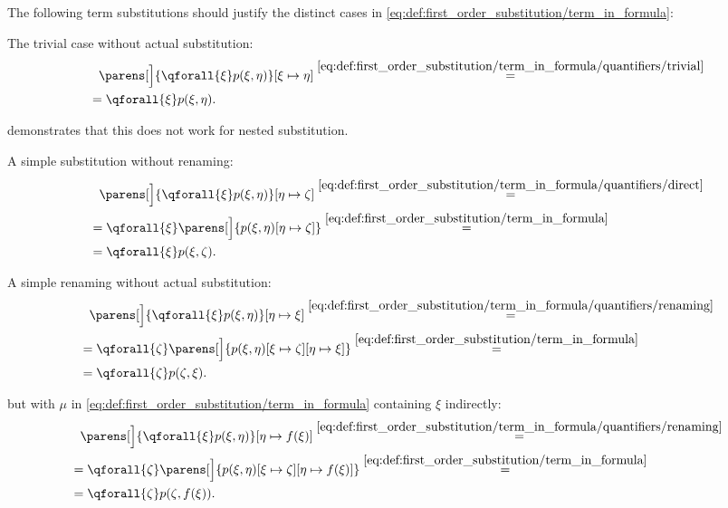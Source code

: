 \begin{example}\label{ex:first_order_substitution}
  The following term substitutions should justify the distinct cases in \eqref{eq:def:first_order_substitution/term_in_formula}:
  \begin{exenum}
     The trivial case without actual substitution:
    \begin{align*}
      &{}\phantom{=}{}
      \parens[\Big]{\qforall{\xi} p(\xi, \eta)}[\xi \mapsto \eta]
      \overset {\eqref{eq:def:first_order_substitution/term_in_formula/quantifiers/trivial}} = \\ &=
      \qforall{\xi} p(\xi, \eta).
    \end{align*}

     demonstrates that this does not work for nested substitution.

     A simple substitution without renaming:
    \begin{align*}
      &{}\phantom{=}{}
      \parens[\Big]{\qforall{\xi} p(\xi, \eta)}[\eta \mapsto \zeta]
      \overset {\eqref{eq:def:first_order_substitution/term_in_formula/quantifiers/direct}} = \\ &=
      \qforall{\xi} \parens[\Big]{p(\xi, \eta)[\eta \mapsto \zeta]}
      \overset {\eqref{eq:def:first_order_substitution/term_in_formula}} = \\ &=
      \qforall{\xi} p(\xi, \zeta).
    \end{align*}

     A simple renaming without actual substitution:
    \begin{align*}
      &{}\phantom{=}{}
      \parens[\Big]{\qforall{\xi} p(\xi, \eta)}[\eta \mapsto \xi]
      \overset {\eqref{eq:def:first_order_substitution/term_in_formula/quantifiers/renaming}} = \\ &=
      \qforall{\zeta} \parens[\Big]{p(\xi, \eta)[\xi \mapsto \zeta][\eta \mapsto \xi]}
      \overset {\eqref{eq:def:first_order_substitution/term_in_formula}} = \\ &=
      \qforall{\zeta} p(\zeta, \xi).
    \end{align*}

      but with \( \mu \) in \eqref{eq:def:first_order_substitution/term_in_formula} containing \( \xi \) indirectly:
    \begin{align*}
      &{}\phantom{=}{}
      \parens[\Big]{\qforall{\xi} p(\xi, \eta)}[\eta \mapsto f(\xi)]
      \overset {\eqref{eq:def:first_order_substitution/term_in_formula/quantifiers/renaming}} = \\ &=
      \qforall{\zeta} \parens[\Big]{p(\xi, \eta)[\xi \mapsto \zeta][\eta \mapsto f(\xi)]}
      \overset {\eqref{eq:def:first_order_substitution/term_in_formula}} = \\ &=
      \qforall{\zeta} p(\zeta, f(\xi)).
    \end{align*}


\end{exenum}
\end{example}
